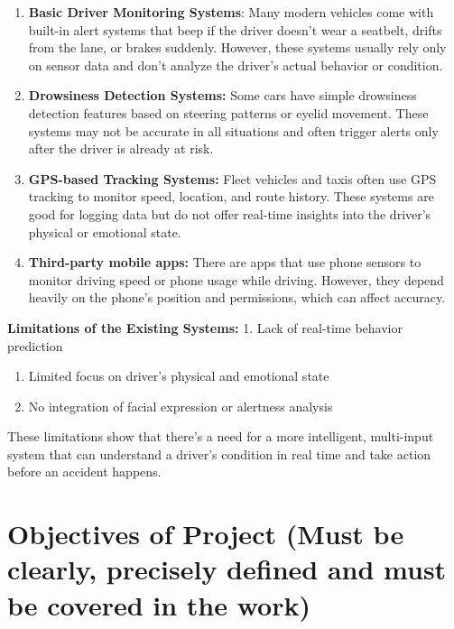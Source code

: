 \documentclass[
  letterpaper,
  DIV=11,
  numbers=noendperiod]{scrreport}
\begin{document}
\begin{enumerate}
\def\labelenumi{\arabic{enumi}.}
\item
  \textbf{Basic Driver Monitoring Systems}: Many modern vehicles come
  with built-in alert systems that beep if the driver doesn't wear a
  seatbelt, drifts from the lane, or brakes suddenly. However, these
  systems usually rely only on sensor data and don't analyze the
  driver's actual behavior or condition.
\item
  \textbf{Drowsiness Detection Systems:} Some cars have simple
  drowsiness detection features based on steering patterns or eyelid
  movement. These systems may not be accurate in all situations and
  often trigger alerts only after the driver is already at risk.
\item
  \textbf{GPS-based Tracking Systems:} Fleet vehicles and taxis often
  use GPS tracking to monitor speed, location, and route history. These
  systems are good for logging data but do not offer real-time insights
  into the driver's physical or emotional state.
\item
  \textbf{Third-party mobile apps:} There are apps that use phone
  sensors to monitor driving speed or phone usage while driving.
  However, they depend heavily on the phone's position and permissions,
  which can affect accuracy.
\end{enumerate}

\textbf{Limitations of the Existing Systems:} 1. Lack of real-time
behavior prediction

\begin{enumerate}
\def\labelenumi{\arabic{enumi}.}
\setcounter{enumi}{1}
\item
  Limited focus on driver's physical and emotional state
\item
  No integration of facial expression or alertness analysis
\end{enumerate}

These limitations show that there's a need for a more intelligent,
multi-input system that can understand a driver's condition in real time
and take action before an accident happens.

\section{Objectives of Project (Must be clearly, precisely defined and
must be covered in the
work)}\label{objectives-of-project-must-be-clearly-precisely-defined-and-must-be-covered-in-the-work}
\end{document}

